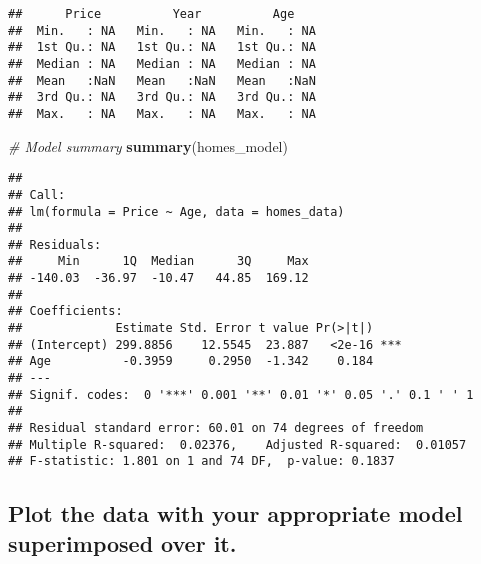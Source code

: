 \documentclass[
]{article}
\newenvironment{Shaded}{\begin{snugshade}}{\end{snugshade}}
\newcommand{\CommentTok}[1]{\textcolor[rgb]{0.56,0.35,0.01}{\textit{#1}}}
\newcommand{\FunctionTok}[1]{\textcolor[rgb]{0.13,0.29,0.53}{\textbf{#1}}}
\newcommand{\NormalTok}[1]{#1}
\begin{document}
\begin{verbatim}
##      Price          Year          Age     
##  Min.   : NA   Min.   : NA   Min.   : NA  
##  1st Qu.: NA   1st Qu.: NA   1st Qu.: NA  
##  Median : NA   Median : NA   Median : NA  
##  Mean   :NaN   Mean   :NaN   Mean   :NaN  
##  3rd Qu.: NA   3rd Qu.: NA   3rd Qu.: NA  
##  Max.   : NA   Max.   : NA   Max.   : NA
\end{verbatim}

\begin{Shaded}
\begin{Highlighting}[]
\CommentTok{\# Model summary}
\FunctionTok{summary}\NormalTok{(homes\_model)}
\end{Highlighting}
\end{Shaded}

\begin{verbatim}
## 
## Call:
## lm(formula = Price ~ Age, data = homes_data)
## 
## Residuals:
##     Min      1Q  Median      3Q     Max 
## -140.03  -36.97  -10.47   44.85  169.12 
## 
## Coefficients:
##             Estimate Std. Error t value Pr(>|t|)    
## (Intercept) 299.8856    12.5545  23.887   <2e-16 ***
## Age          -0.3959     0.2950  -1.342    0.184    
## ---
## Signif. codes:  0 '***' 0.001 '**' 0.01 '*' 0.05 '.' 0.1 ' ' 1
## 
## Residual standard error: 60.01 on 74 degrees of freedom
## Multiple R-squared:  0.02376,    Adjusted R-squared:  0.01057 
## F-statistic: 1.801 on 1 and 74 DF,  p-value: 0.1837
\end{verbatim}

\subsection{Plot the data with your appropriate model superimposed over
it.}\label{plot-the-data-with-your-appropriate-model-superimposed-over-it.}
\end{document}

